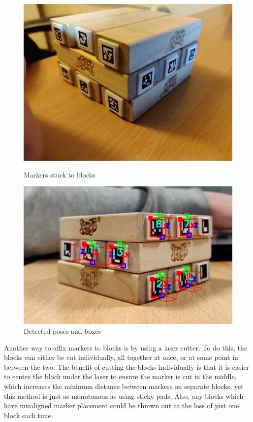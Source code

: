 \begin{figure}[ht]
\centering
\begin{minipage}{0.45\textwidth}
  \includegraphics[width=\linewidth]{images/design/markersonblocks}
  \caption{Markers stuck to blocks}
  \label{fig:markersonblocks}
\end{minipage}
\begin{minipage}{0.45\textwidth}
  \includegraphics[width=\linewidth]{images/design/markersonblockswithposes}
  \caption{Detected poses and boxes}
  \label{fig:markersonblockswithposes}
\end{minipage}
\end{figure}

Another way to affix markers to blocks is by using a laser cutter. To do this, the blocks can either be cut individually, all together at once, or at some point in between the two. The benefit of cutting the blocks individually is that it is easier to centre the block under the laser to ensure the marker is cut in the middle, which increases the minimum distance between markers on separate blocks, yet this method is just as monotonous as using sticky pads. Also, any blocks which have misaligned marker placement could be thrown out at the loss of just one block each time.

